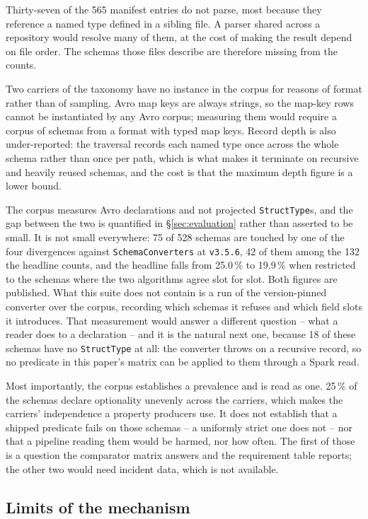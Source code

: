 Thirty-seven of the 565 manifest entries do not parse, most because they reference a named type defined in a sibling file. A parser shared across a repository would resolve many of them, at the cost of making the result depend on file order. The schemas those files describe are therefore missing from the counts.

Two carriers of the taxonomy have no instance in the corpus for reasons of format rather than of sampling. Avro map keys are always strings, so the map-key rows cannot be instantiated by any Avro corpus; measuring them would require a corpus of schemas from a format with typed map keys. Record depth is also under-reported: the traversal records each named type once across the whole schema rather than once per path, which is what makes it terminate on recursive and heavily reused schemas, and the cost is that the maximum depth figure is a lower bound.

The corpus measures Avro declarations and not projected \texttt{StructType}s, and the gap between the two is quantified in \S\ref{sec:evaluation} rather than asserted to be small. It is not small everywhere: 75 of 528 schemas are touched by one of the four divergences against \texttt{SchemaConverters} at \texttt{v3.5.6}, 42 of them among the 132 the headline counts, and the headline falls from 25.0\,\% to 19.9\,\% when restricted to the schemas where the two algorithms agree slot for slot. Both figures are published. What this suite does not contain is a run of the version-pinned converter over the corpus, recording which schemas it refuses and which field slots it introduces. That measurement would answer a different question -- what a reader does to a declaration -- and it is the natural next one, because 18 of these schemas have no \texttt{StructType} at all: the converter throws on a recursive record, so no predicate in this paper's matrix can be applied to them through a Spark read.

Most importantly, the corpus establishes a prevalence and is read as one. 25\,\% of the schemas declare optionality unevenly across the carriers, which makes the carriers' independence a property producers use. It does not establish that a shipped predicate fails on those schemas -- a uniformly strict one does not -- nor that a pipeline reading them would be harmed, nor how often. The first of those is a question the comparator matrix answers and the requirement table reports; the other two would need incident data, which is not available.

\subsection{Limits of the mechanism}

